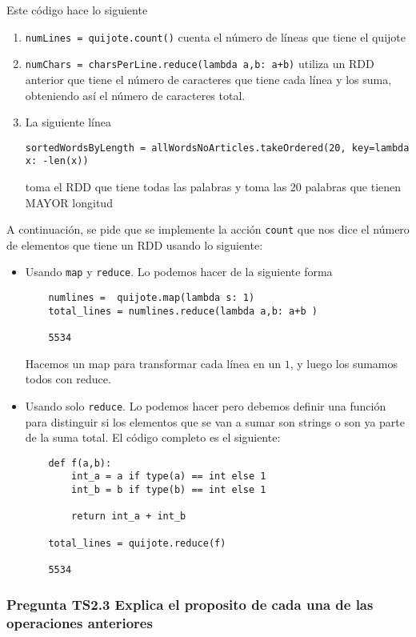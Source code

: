 \documentclass[11pt]{article}
\def\inline{\lstinline[basicstyle=\ttfamily,keywordstyle={}]}
\begin{document}
Este código hace lo siguiente
\begin{enumerate}
\item \inline{numLines = quijote.count()} cuenta el número de líneas que tiene el quijote
\item \inline{numChars = charsPerLine.reduce(lambda a,b: a+b)} utiliza un RDD anterior que tiene el número de caracteres que tiene cada línea y los suma, obteniendo así el número de caracteres total.
\item La siguiente línea
\begin{verbatim}
sortedWordsByLength = allWordsNoArticles.takeOrdered(20, key=lambda x: -len(x))
\end{verbatim} 
toma el RDD que tiene todas las palabras y toma las 20 palabras que tienen MAYOR longitud
\end{enumerate}

A continuación, se pide que se implemente la acción \inline{count} que nos dice el número de elementos que tiene un RDD usando lo siguiente:
\begin{itemize}
    \item Usando \inline{map} y \inline{reduce}. Lo podemos hacer de la siguiente forma
    \begin{verbatim}
    numlines =  quijote.map(lambda s: 1)
    total_lines = numlines.reduce(lambda a,b: a+b )

    5534
    \end{verbatim}

    Hacemos un map para transformar cada línea en un $1$, y luego los sumamos todos con reduce.

    \item Usando solo \inline{reduce}. Lo podemos hacer pero debemos definir una función para distinguir si los elementos que se van a sumar son strings o son ya parte de la suma total. El código completo es el siguiente:
    \begin{verbatim}
    def f(a,b):
        int_a = a if type(a) == int else 1
        int_b = b if type(b) == int else 1
      
        return int_a + int_b
      
    total_lines = quijote.reduce(f)

    5534
    \end{verbatim}

\end{itemize}

\subsubsection*{ Pregunta TS2.3 Explica el proposito de cada una de las operaciones anteriores}
\end{document}
